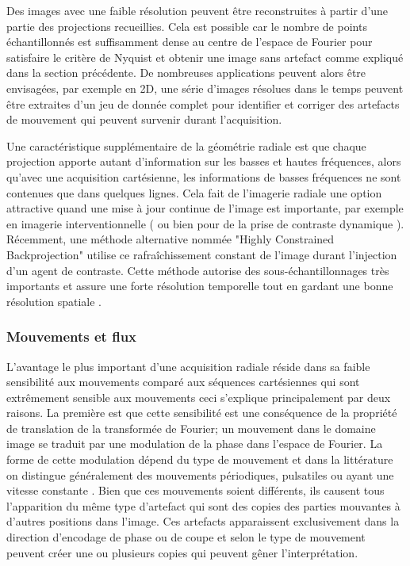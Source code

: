 Des images avec une faible résolution peuvent être reconstruites à partir d'une partie des projections recueillies. Cela est possible car le nombre de points échantillonnés est suffisamment dense au centre de l'espace de Fourier pour satisfaire le critère de Nyquist et obtenir une image sans artefact comme expliqué dans la section précédente. De nombreuses applications peuvent alors être envisagées, par exemple en 2D, une série d'images résolues dans le temps peuvent être extraites d'un jeu de donnée complet pour identifier et corriger des artefacts de mouvement qui peuvent survenir durant l'acquisition.

Une caractéristique supplémentaire de la géométrie radiale est que chaque projection apporte autant d'information sur les basses et hautes fréquences, alors qu'avec une acquisition cartésienne, les informations de basses fréquences ne sont contenues que dans quelques lignes. Cela fait de l'imagerie radiale une option attractive quand une mise à jour continue de l'image est importante, par exemple en imagerie interventionnelle (\cite{Peters:2004aa} ou bien pour de la prise de contraste dynamique \cite{Prieto:2010oq}). Récemment, une méthode alternative nommée "Highly Constrained Backprojection" utilise ce rafraîchissement constant de l'image durant l'injection d'un agent de contraste. Cette méthode autorise des sous-échantillonnages très importants et assure une forte résolution temporelle tout en gardant une bonne résolution spatiale \cite{Wu:2011vn,Grist:2012fk}.

\subsubsection{Mouvements et flux}
\label{subsec:MouvEtFlux}
L'avantage le plus important d'une acquisition radiale réside dans sa faible sensibilité aux mouvements comparé aux séquences cartésiennes qui sont extrêmement sensible aux mouvements ceci s'explique principalement par deux raisons. La première est que cette sensibilité est une conséquence de la propriété de translation de la transformée de Fourier; un mouvement dans le domaine image se traduit par une modulation de la phase dans l'espace de Fourier. La forme de cette modulation dépend du type de mouvement et dans la littérature on distingue généralement des mouvements périodiques, pulsatiles ou ayant une vitesse constante \cite{Glover1991Phase-offset-mu}. Bien que ces mouvements soient différents, ils causent tous l'apparition du même type d'artefact qui sont des copies des parties mouvantes à d'autres positions dans l'image. Ces artefacts apparaissent exclusivement dans la direction d'encodage de phase ou de coupe et selon le type de mouvement peuvent créer une ou plusieurs copies qui peuvent gêner l'interprétation. 

